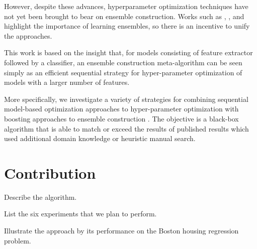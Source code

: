\documentclass[11pt,twocolumn]{article}
\begin{document}
\vspace{11pt}
However, despite these advances, hyperparameter optimization techniques have not 
yet been brought to bear on ensemble construction.  Works such as \citet{gehler}, \citet{coates+lee+ng:2010},
and \citet{fg11} highlight the importance of learning ensembles, so there is an incentive
to unify the approaches.  

\vspace{11pt}
This work is based on the insight that, for models consisting of feature extractor followed by a classifier, 
an ensemble construction meta-algorithm can be seen simply as an
efficient sequential strategy for hyper-parameter optimization of 
models with a larger number of features.

\vspace{11pt}
More specifically, we investigate a variety of strategies for combining sequential model-based
optimization approaches to hyper-parameter optimization with boosting
approaches to ensemble construction \citep{mason,friedman}.  
The objective is a black-box algorithm that is able to match or exceed the
results of published results which used additional domain knowledge or
heuristic manual search.

\section{Contribution}

Describe the algorithm.

List the six experiments that we plan to perform.

Illustrate the approach by its performance on the Boston housing regression problem.
\end{document}
